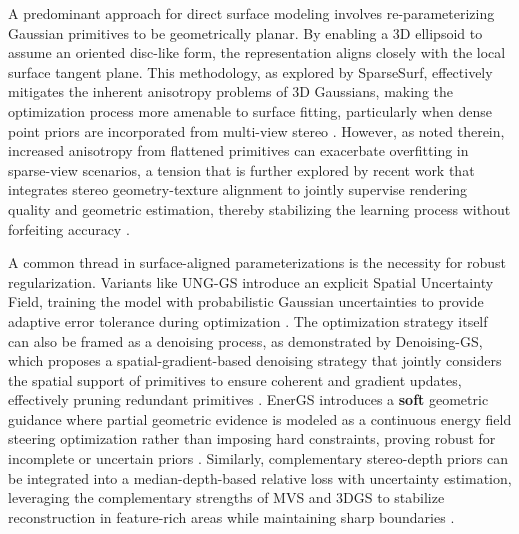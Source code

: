 \documentclass[11pt,a4paper]{article}
\begin{document}
A predominant approach for direct surface modeling involves re-parameterizing Gaussian primitives to be geometrically planar. By enabling a 3D ellipsoid to assume an oriented disc-like form, the representation aligns closely with the local surface tangent plane. This methodology, as explored by SparseSurf, effectively mitigates the inherent anisotropy problems of 3D Gaussians, making the optimization process more amenable to surface fitting, particularly when dense point priors are incorporated from multi-view stereo \cite{arxiv:2511.14633v1}. However, as noted therein, increased anisotropy from flattened primitives can exacerbate overfitting in sparse-view scenarios, a tension that is further explored by recent work that integrates stereo geometry-texture alignment to jointly supervise rendering quality and geometric estimation, thereby stabilizing the learning process without forfeiting accuracy \cite{arxiv:2511.14633v1}.

A common thread in surface-aligned parameterizations is the necessity for robust regularization. Variants like UNG-GS introduce an explicit Spatial Uncertainty Field, training the model with probabilistic Gaussian uncertainties to provide adaptive error tolerance during optimization \cite{arxiv:2503.11172v1}. The optimization strategy itself can also be framed as a denoising process, as demonstrated by Denoising-GS, which proposes a spatial-gradient-based denoising strategy that jointly considers the spatial support of primitives to ensure coherent and gradient updates, effectively pruning redundant primitives \cite{arxiv:2605.14880v1}. EnerGS introduces a \textbf{soft} geometric guidance where partial geometric evidence is modeled as a continuous energy field steering optimization rather than imposing hard constraints, proving robust for incomplete or uncertain priors \cite{arxiv:2604.26238v1}. Similarly, complementary stereo-depth priors can be integrated into a median-depth-based relative loss with uncertainty estimation, leveraging the complementary strengths of MVS and 3DGS to stabilize reconstruction in feature-rich areas while maintaining sharp boundaries \cite{arxiv:2506.13508v1}.
\end{document}
